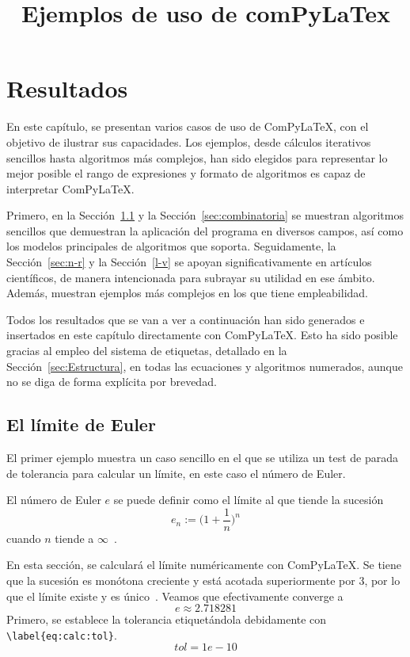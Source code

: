 \documentclass{book}
\title{Ejemplos de uso de comPyLaTex}
\author{}
\date{}
\begin{document}
\maketitle


\chapter{Resultados} \label{chap:resultados}
En este capítulo, se presentan varios casos de uso de ComPyLaTeX, con el objetivo de ilustrar sus capacidades. Los ejemplos, desde cálculos iterativos sencillos hasta algoritmos más complejos, han sido elegidos para representar lo mejor posible el rango de expresiones y formato de algoritmos es capaz de interpretar ComPyLaTeX. 

Primero, en la Sección~\ref{sec:euler} y la Sección~\ref{sec:combinatoria} se muestran algoritmos sencillos que demuestran la aplicación del programa en diversos campos, así como los modelos principales de algoritmos que soporta. Seguidamente, la Sección~\ref{sec:n-r} y la Sección~\ref{l-v} se apoyan significativamente en artículos científicos, de manera intencionada para subrayar su utilidad en ese ámbito. Además, muestran ejemplos más complejos en los que tiene empleabilidad.

Todos los resultados que se van a ver a continuación han sido generados e insertados en este capítulo directamente con ComPyLaTeX. Esto ha sido posible gracias al empleo del sistema de etiquetas, detallado en la Sección~\ref{sec:Estructura}, en todas las ecuaciones y algoritmos numerados, aunque no se diga de forma explícita por brevedad. 

\section{El límite de Euler} \label{sec:euler}
El primer ejemplo muestra un caso sencillo en el que se utiliza un test de parada de tolerancia para calcular un límite, en este caso el número de Euler.

El número de Euler $e$ se puede definir como el límite al que tiende la sucesión $$e_n := \biggl(1+ \frac{1}{n}\biggl)^n$$ cuando $n$ tiende a $\infty$~\cite{chakraborty_eulers_2022}.

En esta sección, se calculará el límite numéricamente con ComPyLaTeX. Se tiene que la sucesión es monótona creciente y está acotada superiormente por $3$, por lo que el límite existe y es único~\cite{apostol_calculo_1990}. Veamos que efectivamente converge a $$e\approx 2.718281$$ 
Primero, se establece la tolerancia etiquetándola debidamente con \verb|\label{eq:calc:tol}|.
\begin{equation}
    tol = 1e-10
    \label{eq:calc:tol}
\end{equation}
\end{document}
